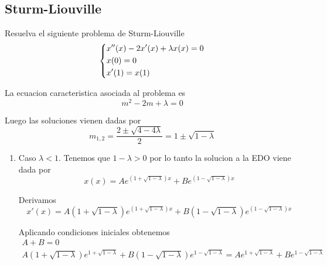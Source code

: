 \documentclass[../main.tex]{subfiles}
\begin{document}
\subsection{Sturm-Liouville}
\begin{problem}
  Resuelva el siguiente problema de Sturm-Liouville
  \begin{equation*}
    \begin{dcases}
      x''(x) - 2x'(x) + \lambda x(x) = 0\\
      x(0) = 0\\
      x'(1) = x(1)
    \end{dcases}
  \end{equation*}
\end{problem}
\begin{solution}
    La ecuacion caracteristica asociada al problema es
    \begin{equation*}
      m^{2} - 2m + \lambda = 0
    \end{equation*}

    Luego las soluciones vienen dadas por
    \begin{equation*}
      m_{1,2} = \frac{2 \pm \sqrt{4 - 4\lambda}}{2} = 1 \pm \sqrt{1 - \lambda}
    \end{equation*}

    \begin{enumerate}
      \item Caso $\lambda < 1$. Tenemos que $1 - \lambda > 0$ por lo tanto la solucion a la EDO
            viene dada por
            \begin{equation*}
              x(x) = Ae^{(1 + \sqrt{1 - \lambda})x} + B e^{(1 - \sqrt{1 - \lambda})x}
            \end{equation*}

            Derivamos
            \begin{equation*}
              x'(x) = A(1 + \sqrt{1 - \lambda})e^{(1 + \sqrt{1 - \lambda})x} + B(1 - \sqrt{1 - \lambda})e^{(1 - \sqrt{1 - \lambda})x}
            \end{equation*}

            Aplicando condiciones iniciales obtenemos
            \begin{gather*}
              A + B = 0\\
              A(1 + \sqrt{1 - \lambda})e^{1 + \sqrt{1 - \lambda}} + B(1 - \sqrt{1 - \lambda})e^{1 - \sqrt{1 - \lambda}} = Ae^{1 + \sqrt{1 - \lambda}} + Be^{1 - \sqrt{1 - \lambda}}
            \end{gather*}


\end{enumerate}
\end{solution}
\end{document}
